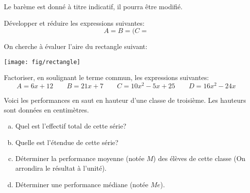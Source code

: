 \documentclass[a4paper,10pt]{/media/documents/Cours/Prof/Enseignements/tools/style/classDS}
\date{26 septemble 2013}
\begin{document}
\maketitle

\Calc
Le barème est donné à titre indicatif, il pourra être modifié.

\begin{Exo}[4.5]
		Développer et réduire les expressions suivantes:
		\begin{equation*}
				A = %
				B = (%
				C = %
		\end{equation*}
\end{Exo}

\begin{Exo}[4]
			On cherche à évaluer l'aire du rectangle suivant:
			\begin{center}
					\texttt{[image: fig/rectangle]}
			\end{center}
\end{Exo}

\begin{Exo}[6]
		Factoriser, en soulignant le terme commun, les expressions suivantes:
		\begin{equation*}
				A = 6x + 12 \qquad B = 21x + 7 \qquad C = 10x^2 - 5x + 25 \qquad D = 16x^2 - 24x
		\end{equation*}
\end{Exo}

\begin{Exo}[5.5]
		Voici les performances en saut en hauteur d'une classe de troisième. Les hauteurs sont données en centimètres.
		\begin{equation*}
		\end{equation*}
		\begin{enumerate}[a.]
				\item Quel est l'effectif total de cette série?
				\item Quelle est l'étendue de cette série?
				\item Déterminer la performance moyenne (notée $M$) des élèves de cette classe (On arrondira le résultat à l'unité).
				\item Déterminer une performance médiane (notée $Me$).
		\end{enumerate}

\end{Exo}
\end{document}
